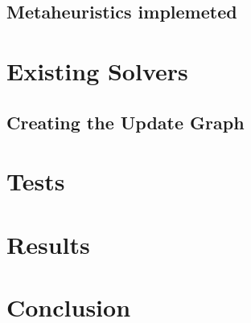 \documentclass[a4paper,10pt]{article}
\begin{document}
\subsection{Metaheuristics implemeted}
\section{Existing Solvers}



%

\newpage
\subsection{Creating the Update Graph} \label{updategraph}

\newpage
\section{Tests}
\section{Results}
\section{Conclusion}
%
\end{document}
